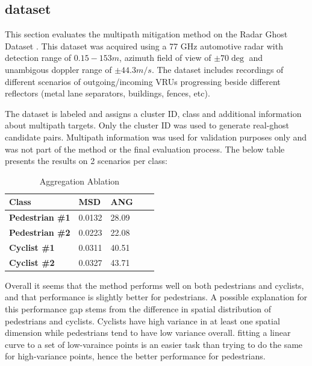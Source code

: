 \documentclass[../main.tex]{subfiles}
\begin{document}
\subsection{dataset}
This section evaluates the multipath mitigation method on the Radar Ghost Dataset \cite{ghost_dataset}. This dataset was acquired using a 77 GHz automotive radar with detection range of $0.15-153m$, azimuth field of view of $\pm70\deg$ and unambigous doppler range of $\pm44.3m/s$. The dataset includes recordings of different scenarios of outgoing/incoming VRUs progressing beside different reflectors (metal lane separators, buildings, fences, etc).

\par
The dataset is labeled and assigns a cluster ID, class and additional information about multipath targets. Only the cluster ID was used to generate real-ghost candidate pairs. Multipath information was used for validation purposes only and was not part of the method or the final evaluation process. The below table presents the results on 2 scenarios per class:

 

\begin{table}[htbp]
    \caption{Aggregation Ablation}
    \begin{center}
    \begin{tabular}{lllll}
    \hline
    \textbf{Class}                      & \textbf{MSD}                & \textbf{ANG}               &  &  \\ \hline
    \textbf{Pedestrian \#1}             & 0.0132                      & 28.09                      &  &  \\ \hline
    \textbf{Pedestrian \#2}             & 0.0223                      & 22.08                      &  &  \\ \hline
    \textbf{Cyclist \#1}                & 0.0311                      & 40.51                      &  &  \\ \hline
    \textbf{Cyclist \#2}                & 0.0327                      & 43.71                      &  &  \\ \hline
    \end{tabular}
    \end{center}
\end{table}

Overall it seems that the method performs well on both pedestrians and cyclists, and that performance is slightly better for pedestrians. A possible explanation for this performance gap stems from the difference in spatial distribution of pedestrians and cyclists. Cyclists have high variance in at least one spatial dimension while pedestrians tend to have low variance overall. fitting a linear curve to a set of low-varaince points is an easier task than trying to do the same for high-variance points, hence the better performance for pedestrians.
\end{document}
